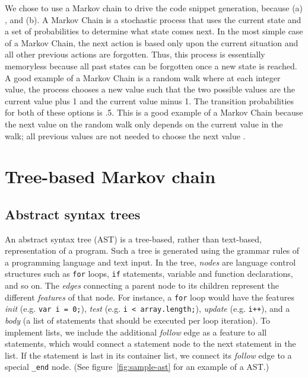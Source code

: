 \documentclass{article}
\begin{document}
We chose to use a Markov chain to drive the code snippet generation, because
(a) , and (b). A Markov Chain is a stochastic process
that uses the current state and a set of probabilities to determine what state
comes next. In the most simple case of a Markov Chain, the next action is based
only upon the current situation and all other previous actions are forgotten.
Thus, this process is essentially memoryless because all past states can be
forgotten once a new state is reached. A good example of a Markov Chain is a
random walk where at each integer value, the process chooses a new value such
that the two possible values are the current value plus 1 and the current value
minus 1. The transition probabilities for both of these options is .5. This is a
good example of a Markov Chain because the next value on the random walk only
depends on the current value in the walk; all previous values are not needed to
choose the next value \cite{markov}.


\section{Tree-based Markov chain}

\subsection{Abstract syntax trees}

An abstract syntax tree (AST) is a tree-based, rather than text-based, representation of a program.
Such a tree is generated using the grammar rules of a programming language and text input. In the tree, \emph{nodes}
are language control structures such as {\tt for} loops, {\tt if} statements, variable and function
declarations, and so on. The \emph{edges} connecting a parent node to its children represent the different \emph{features}
of that node. For instance, a {\tt for} loop would have the features \emph{init} (e.g. {\tt var i = 0;}),
\emph{test} (e.g. {\tt i < array.length;}), \emph{update} (e.g. {\tt i++}), and a \emph{body} (a list
of statements that should be executed per loop iteration). To implement lists, we include the additional
\emph{follow} edge as a feature to all statements, which would connect a statement node to the next statement
in the list. If the statement is last in its container list, we connect its \emph{follow} edge to a special
{\tt {\_end}} node. (See figure~\ref{fig:sample-ast} for an example of a AST.)
\end{document}

